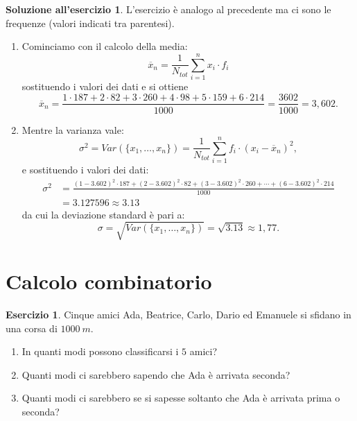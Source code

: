 \documentclass[12pt,a4paper]{article}
\theoremstyle{definition}
\newtheorem{sol}{Soluzione all'esercizio}
\newtheorem{exe}{Esercizio}
\begin{document}
\begin{sol}
	L'esercizio è analogo al precedente ma ci sono le frequenze (valori indicati tra parentesi).
	\begin{enumerate}
		\item Cominciamo con il calcolo della media:
		      \[ \overline{x}_n = \frac{1}{N_{tot}} \sum_{i=1}^{n}x_i \cdot f_i \]
		      sostituendo i valori dei dati e si ottiene
		      \[ \overline{x}_n = \frac{1\cdot 187 + 2\cdot 82 + 3 \cdot 260 + 4\cdot 98 + 5\cdot 159+ 6\cdot 214}{1000} = \frac{3602}{1000} = 3,602. \]
		\item Mentre la varianza vale:
		      \[ \sigma^2 = Var(\{x_1, \dots, x_n\}) = \frac{1}{N_{tot}} \sum_{i=1}^{n}f_i\cdot(x_i-\overline{x}_n)^2, \]
		      e sostituendo i valori dei dati:
		      \[ \begin{split}
				      \sigma^2 & = \frac{(1-3.602)^2\cdot 187 + (2-3.602)^2\cdot 82 + (3-3.602)^2\cdot 260 +\cdots + (6-3.602)^2\cdot 214}{1000} \\
				               & = 3.127596 \approx 3.13
			      \end{split}\]
		      da cui la deviazione standard è pari a:
		      \[ \sigma = \sqrt{Var(\{x_1, \dots, x_n\})} = \sqrt{3.13} \approx 1,77 . \]
	\end{enumerate}
\end{sol}

\section{Calcolo combinatorio}

\begin{exe}
	Cinque amici Ada, Beatrice, Carlo, Dario ed Emanuele si sfidano in una corsa di $ 1000 \ m$.
	\begin{enumerate}
		\item In quanti modi possono classificarsi i $ 5 $ amici?
		\item Quanti modi ci sarebbero sapendo che Ada è arrivata seconda?
		\item Quanti modi ci sarebbero se si sapesse soltanto che Ada è arrivata prima o seconda?
	\end{enumerate}
\end{exe}
\end{document}
